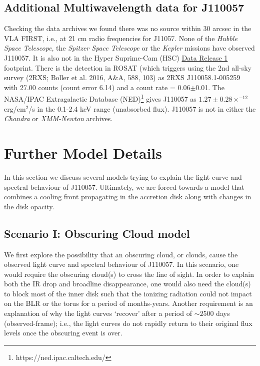 \documentclass[11pt,a4paper]{article}
\begin{document}
\subsection*{Additional Multiwavelength data for J110057}
Checking the data archives we found there was no source within 30
arcsec in the VLA FIRST, i.e., at 21 cm radio frequencies for J11057.
None of the {\it Hubble Space Telescope}, the {\it Spitzer Space
Telescope} or the {\it Kepler} missions have observed J110057.  It is
also not in the Hyper Suprime-Cam (HSC)
\href{https://hsc-release.mtk.nao.ac.jp/doc/}{Data Release 1}
\citep{Aihara2017} footprint. There is the detection in ROSAT (which
triggers using the 2nd all-sky survey (2RXS; Boller et al. 2016, A\&A,
588, 103) as 2RXS J110058.1-005259 with 27.00 counts (count error
6.14) and a count rate = 0.06$\pm$0.01. The  NASA/IPAC Extragalactic Database 
(NED)\footnote{https://ned.ipac.caltech.edu/} gives J110057 as
$1.27\pm0.28 \times^{-12}$ erg/cm$^{2}$/s in the 0.1-2.4 keV range
(unabsorbed flux). J110057 is not in either the {\it Chandra} or {\it
XMM-Newton} archives. 


\section*{Further Model Details}
In this section we discuss several models trying to explain the light
curve and spectral behaviour of J110057. Ultimately, we are forced
towards a model that combines a cooling front propagating in the
accretion disk along with changes in the disk opacity.

\subsection*{Scenario I: Obscuring Cloud model}
We first explore the possibility that an obscuring cloud, or clouds,
cause the observed light curve and spectral behaviour of J110057.  In
this scenario, one would require the obscuring cloud(s) to cross the
line of sight. In order to explain both the IR drop and broadline
disappearance, one would also need the cloud(s) to block most of the
inner disk such that the ionizing radiation could not impact on the
BLR or the torus for a period of months-years.  Another requirement
is an explanation of why the light curves `recover' after a period of
$\sim 2500$ days (observed-frame); i.e., the light curves do not
rapidly return to their original flux levels once the obscuring event
is over.
\end{document}
